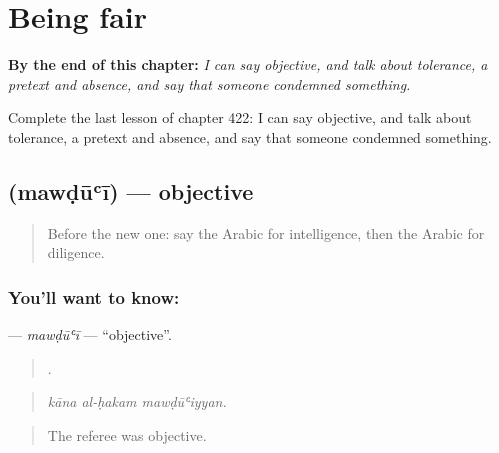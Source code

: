 
\chapter{Being fair}
\label{ch:ar-being-fair}

\begin{chapteropening}
\textbf{By the end of this chapter:} \emph{I can say objective, and talk about tolerance, a pretext and absence, and say that someone condemned something.}

Complete the last lesson of chapter 422: I can say objective, and talk about tolerance, a pretext and absence, and say that someone condemned something.
\end{chapteropening}

\section[\texorpdfstring{\ar{موضوعي} (mawḍūʿī)}{موضوعي (mawḍūʿī)}]{ (mawḍūʿī) — objective}

\label{lesson:AR-C422-mawdui}



\begin{quote}
Before the new one: say the Arabic for intelligence, then the Arabic for diligence.
\end{quote}

\subsection*{You'll want to know: }
\textbf{} — \emph{mawḍūʿī} — \textquotedblleft{}objective\textquotedblright{}.

\begin{quote}
  .
\end{quote}

\begin{quote}
\emph{kāna al-ḥakam mawḍūʿiyyan.}
\end{quote}

\begin{quote}
The referee was objective.
\end{quote}


